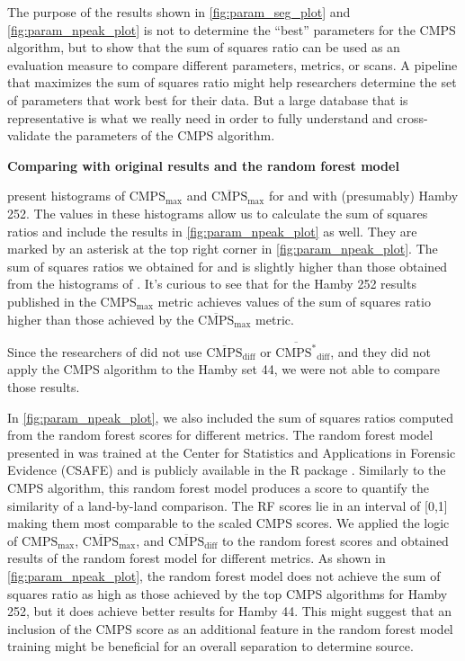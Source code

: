 The purpose of the results shown in \autoref{fig:param_seg_plot} and
\autoref{fig:param_npeak_plot} is not to determine the ``best''
parameters for the CMPS algorithm, but to show that the sum of squares
ratio can be used as an evaluation measure to compare different
parameters, metrics, or scans. A pipeline that maximizes the sum of
squares ratio might help researchers determine the set of parameters
that work best for their data. But a large database that is
representative is what we really need in order to fully understand and
cross-validate the parameters of the CMPS algorithm.

\textbf{Comparing with original results and the random forest model}

\citet{cmps} present histograms of \(\mathrm{CMPS_{max}}\) and
\(\mathrm{\overline{CMPS}_{max}}\) for  and
 with (presumably) Hamby 252. The values in
these histograms allow us to calculate the sum of squares ratios and
include the results in \autoref{fig:param_npeak_plot} as well. They are
marked by an asterisk at the top right corner in
\autoref{fig:param_npeak_plot}. The sum of squares ratios we obtained
for  and  is slightly
higher than those obtained from the histograms of \citet{cmps}. It's
curious to see that for the Hamby 252 results published in \citet{cmps}
the \(\mathrm{{CMPS}_{max}}\) metric achieves values of the sum of
squares ratio higher than those achieved by the
\(\mathrm{\overline{CMPS}_{max}}\) metric.

Since the researchers of \citet{cmps} did not use
\(\mathrm{\overline{CMPS}_{diff}}\) or
\(\mathrm{\overline{CMPS^*}_{diff}}\), and they did not apply the CMPS
algorithm to the Hamby set 44, we were not able to compare those
results.

In \autoref{fig:param_npeak_plot}, we also included the sum of squares
ratios computed from the random forest scores \citep{aoas} for different
metrics. The random forest model presented in \citet{aoas} was trained
at the Center for Statistics and Applications in Forensic Evidence
(CSAFE) and is publicly available in the R package 
\citep{bulletxtrctr}. Similarly to the CMPS algorithm, this random
forest model produces a score to quantify the similarity of a
land-by-land comparison. The RF scores lie in an interval of {[}0,1{]}
making them most comparable to the scaled CMPS scores. We applied the
logic of \(\mathrm{{CMPS}_{max}}\), \(\mathrm{\overline{CMPS}_{max}}\),
and \(\mathrm{\overline{CMPS}_{diff}}\) to the random forest scores and
obtained results of the random forest model for different metrics. As
shown in \autoref{fig:param_npeak_plot}, the random forest model does
not achieve the sum of squares ratio as high as those achieved by the
top CMPS algorithms for Hamby 252, but it does achieve better results
for Hamby 44. This might suggest that an inclusion of the CMPS score as
an additional feature in the random forest model training might be
beneficial for an overall separation to determine source.

